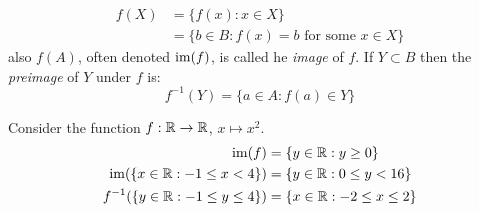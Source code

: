 \documentclass[../main.tex]{subfiles}
\begin{document}
\begin{align*}
  f(X) &= \{f(x): x \in X\} \\
       &= \{b \in B: f(x) = b \text{ for some } x \in X\}
\end{align*}
also $f(A)$, often denoted $\operatorname{im}(f)$, is called he \textit{image} of $f$.
If $Y \subset B$ then the \textit{preimage} of $Y$ under $f$ is:
\[
  f^{-1}(Y) = \{a \in A: f(a) \in Y\}
\]
\begin{example}
  Consider the function $f: \mathbb{R} \to \mathbb{R}$, $x \mapsto x^2$.
  \begin{align*}
    \operatorname{im}(f) &= \{y \in \mathbb{R}: y\geq0\} \\
    \operatorname{im}(\{x \in \mathbb{R}: -1 \leq x < 4\}) &= \{y \in \mathbb{R}: 0 \leq y < 16\} \\
    f^{-1}(\{y \in \mathbb{R}: -1 \leq y \leq 4\}) &= \{x \in \mathbb{R}: -2 \leq x \leq 2\}
  \end{align*}
\end{example}
\end{document}
